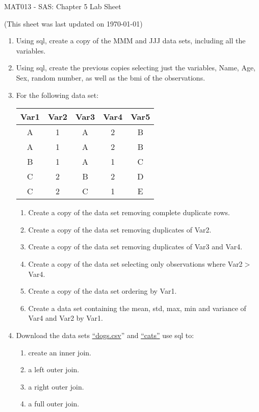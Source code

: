 \documentclass[12pt]{article}
\begin{document}
\begin{center}
\huge{MAT013 - SAS: Chapter 5 Lab Sheet}\\
\begin{center}
\tiny{(This sheet was last updated on \today)}
\end{center}
\end{center}

\begin{enumerate}
\item Using sql, create a copy of the MMM and JJJ data sets, including all the variables.
\item Using sql, create the previous copies selecting just the variables, Name, Age, Sex, random number, as well as the bmi of the observations.
\item For the following data set:
\begin{center}
\begin{tabular}{|c|c|c|c|c|}
\hline
Var1&Var2&Var3&Var4&Var5\\\hline\hline
A&1&A&2&B\\\hline
A&1&A&2&B\\\hline
B&1&A&1&C\\\hline
C&2&B&2&D\\\hline
C&2&C&1&E\\\hline
\end{tabular}
\end{center}
\begin{enumerate}
\item Create a copy of the data set removing complete duplicate rows.
\item Create a copy of the data set removing duplicates of Var2.
\item Create a copy of the data set removing duplicates of Var3 and Var4. 
\item Create a copy of the data set selecting only observations where Var2$>$Var4.
\item Create a copy of the data set ordering by Var1.
\item Create a data set containing the mean, std, max, min and variance of Var4 and Var2 by Var1.
\end{enumerate}
\item Download the data sets \href{https://docs.google.com/file/d/0Bx_zrw5uAafbekVHY0tLMlJydzA/edit}{ ``dogs.csv}'' and \href{https://docs.google.com/file/d/0Bx_zrw5uAafbVzNLeVNDSXNiSkU/edit}{``cats''} use sql to:
\begin{enumerate}
\item create an inner join.
\item a left outer join.
\item a right outer join.
\item a full outer join.
\end{enumerate}
\end{enumerate}
\end{document}
